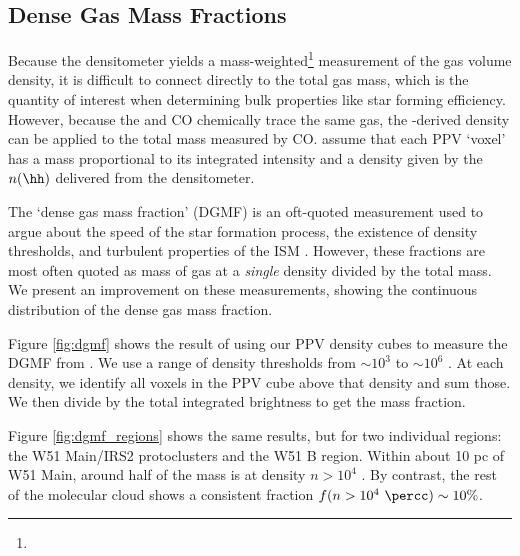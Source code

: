 \subsection{Dense Gas Mass Fractions}
Because the \formaldehyde densitometer yields a
mass-weighted\footnote{}
measurement of
the gas volume density, it is difficult to connect directly to the total gas
mass, which is the quantity of interest when determining bulk properties like
star forming efficiency.  However, because the \formaldehyde and CO chemically
trace the same gas, the \formaldehyde-derived density can be applied to the
total mass measured by CO.    assume that each \thirteenco PPV
`voxel' has a mass proportional to its integrated intensity and a density given
by the $n(\hh)$ delivered from the \formaldehyde densitometer.

The `dense gas mass fraction' (DGMF) is an oft-quoted measurement used to argue
about the speed of the star formation process, the existence of density
thresholds, and turbulent properties of the ISM \citep[e.g. Fig. 5
of][]{Krumholz2007a,Battisti2014a,Kainulainen2013a,Juneau2009a,Muraoka2009a,Hopkins2013e}.
However, these fractions are most often quoted as mass of gas at a \emph{single}
density divided by the total mass.  We present an improvement on these measurements,
showing the continuous distribution of the dense gas mass fraction.

Figure \ref{fig:dgmf} shows the result of using our \formaldehyde PPV density
cubes to measure the DGMF from \thirteenco.  We use a range of density
thresholds from $\sim10^3$ to $\sim10^6$ \percc.  At each density, we identify
all voxels in the \thirteenco PPV cube above that density and sum those.  We
then divide by the total integrated \thirteenco brightness to get the mass
fraction. 

Figure \ref{fig:dgmf_regions} shows the same results, but for two individual
regions: the W51 Main/IRS2 protoclusters and the W51 B region.  Within about 10 pc
of W51 Main, around half of the mass is at density $n>10^4$ \percc.  By
contrast, the rest of the molecular cloud shows a consistent fraction
$f(n>10^4~\percc) \sim10\%$.

